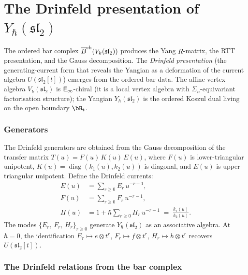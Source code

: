 \section{The Drinfeld presentation of $Y_\hbar(\mathfrak{sl}_2)$}
\label{subsec:drinfeld-yangian-sl2}

The ordered bar complex $\overline{B}^{\mathrm{ch}}(V_k(\mathfrak{sl}_2))$ produces the
Yang $R$-matrix, the RTT presentation, and the Gauss decomposition.
The \emph{Drinfeld presentation} (the generating-current
form that reveals the Yangian as a deformation of the current algebra
$U(\mathfrak{sl}_2[t])$) emerges from the ordered bar data. The affine vertex algebra
$V_k(\mathfrak{sl}_2)$ is $\mathsf{E}_{\infty}$-chiral (it is a local vertex algebra
with $\Sigma_n$-equivariant factorisation structure); the Yangian
$Y_\hbar(\mathfrak{sl}_2)$ is the ordered Koszul dual living on the
open boundary $\bR_t$.

\subsubsection*{Generators}

The Drinfeld generators are obtained from the Gauss decomposition of the
transfer matrix $T(u) = F(u)\,K(u)\,E(u)$, where $F(u)$ is
lower-triangular unipotent, $K(u) = \operatorname{diag}(k_1(u),k_2(u))$
is diagonal, and $E(u)$ is upper-triangular unipotent. Define the
Drinfeld currents:
\begin{align}
\label{eq:drinfeld-E-current}
E(u) &= \sum_{r \ge 0} E_r\,u^{-r-1}, \\
\label{eq:drinfeld-F-current}
F(u) &= \sum_{r \ge 0} F_r\,u^{-r-1}, \\
\label{eq:drinfeld-H-current}
H(u) &= 1 + \hbar\sum_{r \ge 0} H_r\,u^{-r-1}
\;=\; \frac{k_1(u)}{k_2(u)}.
\end{align}
The modes $\{E_r,\,F_r,\,H_r\}_{r \ge 0}$ generate $Y_\hbar(\mathfrak{sl}_2)$
as an associative algebra. At $\hbar = 0$, the identification
$E_r \mapsto e \otimes t^r$, $F_r \mapsto f \otimes t^r$,
$H_r \mapsto h \otimes t^r$ recovers $U(\mathfrak{sl}_2[t])$.

\subsubsection*{The Drinfeld relations from the bar complex}

